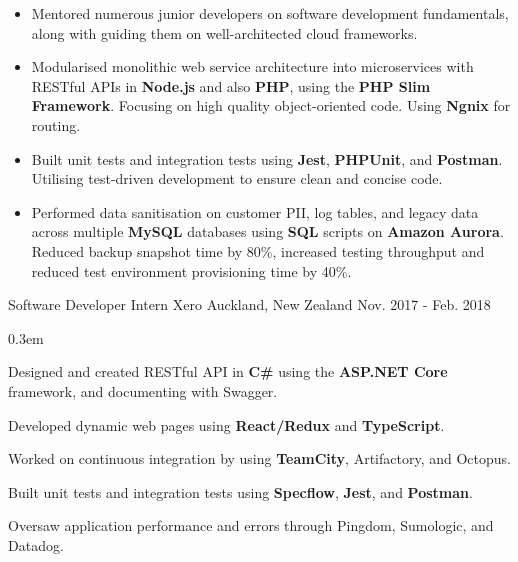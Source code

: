 \begin{cventries}
{\begin{cvitems}
{\begin{itemize}[leftmargin=14pt,topsep=5pt]
                \item {Mentored numerous junior developers on software development fundamentals, along with guiding them on well-architected cloud frameworks.}
              \end{itemize}}
        \item[] {
            \begin{itemize}[leftmargin=14pt,topsep=5pt] %
                \itemsep0.3em
                \item {Modularised monolithic web service architecture into microservices with RESTful APIs in \textbf{Node.js} and also \textbf{PHP}, using the \textbf{PHP Slim Framework}. Focusing on high quality object-oriented code. Using \textbf{Ngnix} for routing.}
                \item {Built unit tests and integration tests using \textbf{Jest}, \textbf{PHPUnit}, and \textbf{Postman}. Utilising test-driven development to ensure clean and concise code.}
                \item {Performed data sanitisation on customer PII, log tables, and legacy data across multiple \textbf{MySQL} databases using \textbf{SQL} scripts on \textbf{Amazon Aurora}. Reduced backup snapshot time by 80\%, increased testing throughput and reduced test environment provisioning time by 40\%.}
              \end{itemize}}
      \end{cvitems}
    }

  \cventry
    {Software Developer Intern} %
    {Xero} %
    {Auckland, New Zealand} %
    {Nov. 2017 - Feb. 2018} %
    {
      \begin{cvitems2} %
        \itemsep0.3em
        \item {Designed and created RESTful API in \textbf{C\#} using the \textbf{ASP.NET Core} framework, and documenting with Swagger.}
        \item {Developed dynamic web pages using \textbf{React/Redux} and \textbf{TypeScript}.}
        \item {Worked on continuous integration by using \textbf{TeamCity}, Artifactory, and Octopus.}
        \item {Built unit tests and integration tests using \textbf{Specflow}, \textbf{Jest}, and \textbf{Postman}.}
        \item {Oversaw application performance and errors through Pingdom, Sumologic, and Datadog.}
      \end{cvitems2}
    }


\end{cventries}
